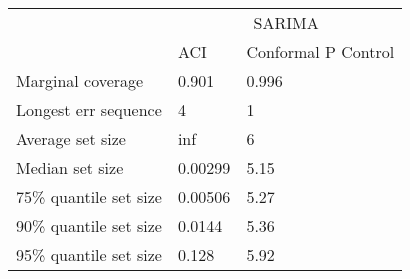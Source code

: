 \begin{tabular}{lll}
\toprule
& \multicolumn{2}{c}{SARIMA} \\
& ACI & Conformal P Control \\
\midrule
Marginal coverage & 0.901 & 0.996 \\
Longest err sequence & 4 & 1 \\
Average set size & inf & 6 \\
Median set size & 0.00299 & 5.15 \\
75\% quantile set size & 0.00506 & 5.27 \\
90\% quantile set size & 0.0144 & 5.36 \\
95\% quantile set size & 0.128 & 5.92 \\
\bottomrule
\end{tabular}
